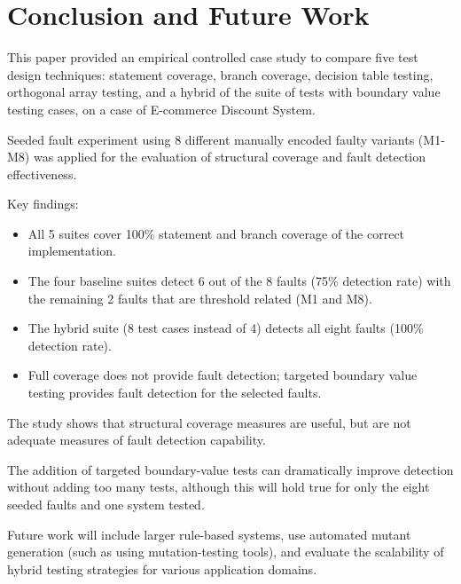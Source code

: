\documentclass[conference]{IEEEtran}
\begin{document}

\section{Conclusion and Future Work}

\label{sec:conclusion}



This paper provided an empirical controlled case study to compare five test design techniques: statement coverage, branch coverage, decision table testing, orthogonal array testing, and a hybrid of the suite of tests with boundary value testing cases, on a case of E-commerce Discount System.

Seeded fault experiment using 8 different manually encoded faulty variants (M1-M8) was applied for the evaluation of structural coverage and fault detection effectiveness.



Key findings:

\begin{itemize}

\item All 5 suites cover 100\% statement and branch coverage of the correct implementation.

\item The four baseline suites detect 6 out of the 8 faults (75\% detection rate) with the remaining 2 faults that are threshold related (M1 and M8).

\item The hybrid suite (8 test cases instead of 4) detects all eight faults (100\% detection rate).

\item Full coverage does not provide fault detection; targeted boundary value testing provides fault detection for the selected faults.

\end{itemize}



The study shows that structural coverage measures are useful, but are not adequate measures of fault detection capability.

The addition of targeted boundary-value tests can dramatically improve detection without adding too many tests, although this will hold true for only the eight seeded faults and one system tested.

Future work will include larger rule-based systems, use automated mutant generation (such as using mutation-testing tools), and evaluate the scalability of hybrid testing strategies for various application domains.
\end{document}
